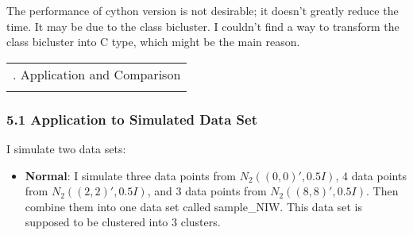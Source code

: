 \documentclass{article}
\begin{document}
    The performance of cython version is not desirable; it doesn't greatly
reduce the time. It may be due to the class bicluster. I couldn't find a
way to transform the class bicluster into C type, which might be the
main reason.

    \begin{longtable}[c]{@{}l@{}}
\toprule\addlinespace
5. Application and Comparison
\\\addlinespace
\bottomrule
\end{longtable}

\subsubsection{5.1 Application to Simulated Data
Set}\label{application-to-simulated-data-set}

I simulate two data sets:

\begin{itemize}
\itemsep1pt\parskip0pt
\item
  \textbf{Normal}: I simulate three data points from $N_2((0,0)',0.5I)$,
  4 data points from $N_2((2,2)',0.5I)$, and 3 data points from
  $N_2((8,8)',0.5I)$. Then combine them into one data set called
  sample\_NIW. This data set is supposed to be clustered into 3
  clusters.
\end{itemize}
\end{document}
